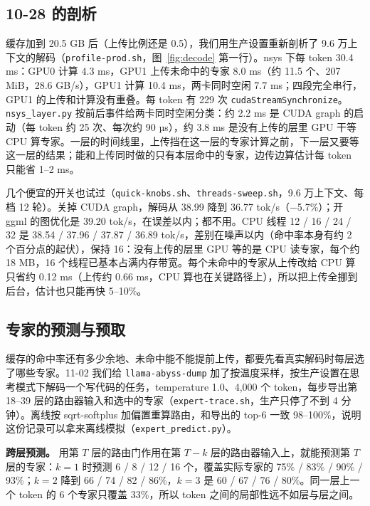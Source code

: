 \documentclass[11pt,a4paper]{article}
\newcommand{\code}[1]{\texttt{#1}}
\newcommand{\tps}{tok/s}
\begin{document}
\subsection{10-28 的剖析}
\label{sec:remaining}

缓存加到 20.5 GB 后（上传比例还是 0.5），我们用生产设置重新剖析了 9.6 万上下文的解码（\code{profile-prod.sh}，图~\ref{fig:decode} 第一行）。nsys 下每 token 30.4 ms：GPU0 计算 4.3 ms，GPU1 上传未命中的专家 8.0 ms（约 11.5 个、207 MiB，28.6 GB/s），GPU1 计算 10.4 ms，两卡同时空闲 7.7 ms；四段完全串行，GPU1 的上传和计算没有重叠。每 token 有 229 次 \code{cudaStreamSynchronize}。\code{nsys\_layer.py} 按前后事件给两卡同时空闲分类：约 2.2 ms 是 CUDA graph 的启动（每 token 约 25 次、每次约 90 µs），约 3.8 ms 是没有上传的层里 GPU 干等 CPU 算专家。一层的时间线里，上传挡在这一层的专家计算之前，下一层又要等这一层的结果；能和上传同时做的只有本层命中的专家，边传边算估计每 token 只能省 1--2 ms。

几个便宜的开关也试过（\code{quick-knobs.sh}、\code{threads-sweep.sh}，9.6 万上下文、每档 12 轮）。关掉 CUDA graph，解码从 38.99 降到 36.77 \tps{}（$-$5.7\%）；开 ggml 的图优化是 39.20 \tps{}，在误差以内；都不用。CPU 线程 12 / 16 / 24 / 32 是 38.54 / 37.96 / 37.87 / 36.89 \tps{}，差别在噪声以内（命中率本身有约 2 个百分点的起伏），保持 16：没有上传的层里 GPU 等的是 CPU 读专家，每个约 18 MB，16 个线程已基本占满内存带宽。每个未命中的专家从上传改给 CPU 算只省约 0.12 ms（上传约 0.66 ms，CPU 算也在关键路径上），所以把上传全挪到后台，估计也只能再快 5--10\%。

\subsection{专家的预测与预取}
\label{sec:predict}

缓存的命中率还有多少余地、未命中能不能提前上传，都要先看真实解码时每层选了哪些专家。11-02 我们给 \code{llama-abyss-dump} 加了按温度采样，按生产设置在思考模式下解码一个写代码的任务，temperature 1.0、4,000 个 token，每步导出第 18--39 层的路由器输入和选中的专家（\code{expert-trace.sh}，生产只停了不到 4 分钟）。离线按 sqrt-softplus 加偏置重算路由，和导出的 top-6 一致 98--100\%，说明这份记录可以拿来离线模拟（\code{expert\_predict.py}）。

\textbf{跨层预测。} 用第 $T$ 层的路由门作用在第 $T-k$ 层的路由器输入上，就能预测第 $T$ 层的专家：$k=1$ 时预测 6 / 8 / 12 / 16 个，覆盖实际专家的 75\% / 83\% / 90\% / 93\%；$k=2$ 降到 66 / 74 / 82 / 86\%，$k=3$ 是 60 / 67 / 76 / 80\%。同一层上一个 token 的 6 个专家只覆盖 33\%，所以 token 之间的局部性远不如层与层之间。
\end{document}
